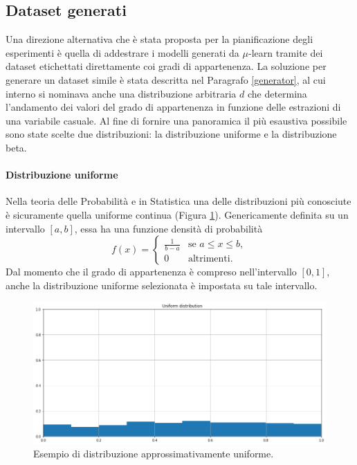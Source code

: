 \documentclass[12pt]{report}
\theoremstyle{definition}
\begin{document}
\subsection{Dataset generati}\label{generated_datasets}
Una direzione alternativa che è stata proposta per la pianificazione degli esperimenti è quella di addestrare i modelli generati da $\mu$-learn tramite dei dataset etichettati direttamente coi gradi di appartenenza. 
La soluzione per generare un dataset simile è stata descritta nel Paragrafo \ref{generator}, al cui interno si nominava anche una distribuzione arbitraria $d$ che determina l'andamento dei valori del grado di appartenenza in funzione delle estrazioni di una variabile casuale. Al fine di fornire una panoramica il più esaustiva possibile sono state scelte due distribuzioni: la distribuzione uniforme e la distribuzione beta.

\paragraph{Distribuzione uniforme}
Nella teoria delle Probabilità e in Statistica una delle distribuzioni più conosciute è sicuramente quella uniforme continua (Figura \ref{uniforme}). Genericamente definita su un intervallo $[a,b]$, essa ha una funzione densità di probabilità
\begin{equation}
    f(x)= \begin{cases} \frac{1}{b-a} & \mbox{se } a\leq x \leq b, \\ 0 & \mbox{altrimenti.} \end{cases}
\end{equation}
Dal momento che il grado di appartenenza è compreso nell'intervallo $[0,1]$, anche la distribuzione uniforme selezionata è impostata su tale intervallo. 
\begin{figure}
    \centering
    \includegraphics[scale=0.4]{images/uniform.png}
    \caption{Esempio di distribuzione approssimativamente uniforme.}
    \label{uniforme}
\end{figure}
\end{document}
